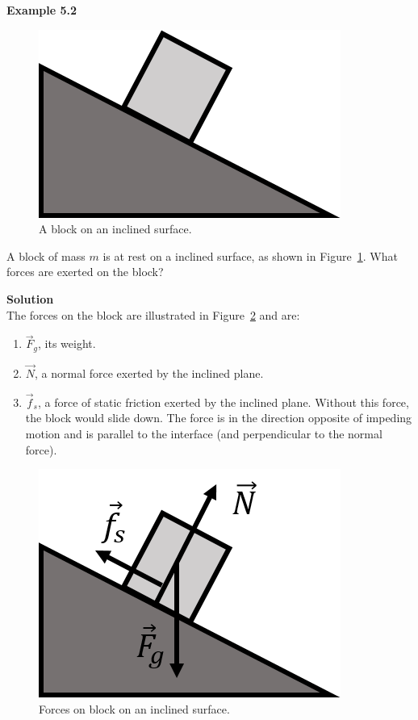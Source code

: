 \begin{framed}
\textbf{Example 5.2}\\
\begin{figure}[!htbp]
\centering
\includegraphics[width=0.2\linewidth]{files/blockI-3db8645a1af042fb7c6876e81faf123a.png}
\caption[]{A block on an inclined surface.}
\label{fig:newtonslaws:blockI}
\end{figure}

A block of mass $m$ is at rest on a inclined surface, as shown in Figure~\ref{fig:newtonslaws:blockI}. What forces are exerted on the block?

\begin{framed}
\textbf{Solution}\\
The forces on the block are illustrated in Figure~\ref{fig:newtonslaws:blockI_forces} and are:

\begin{enumerate}
\item $\vec F_g$, its weight.
\item $\vec N$, a normal force exerted by the inclined plane.
\item $\vec f_s$, a force of static friction exerted by the inclined plane. Without this force, the block would slide down. The force is in the direction opposite of impeding motion and is parallel to the interface (and perpendicular to the normal force).
\end{enumerate}

\begin{figure}[!htbp]
\centering
\includegraphics[width=0.2\linewidth]{files/blockI_forces-afd3e702cb9372b2d1e26821e36eaefc.png}
\caption[]{Forces on block on an inclined surface.}
\label{fig:newtonslaws:blockI_forces}
\end{figure}
\end{framed}
\end{framed}

